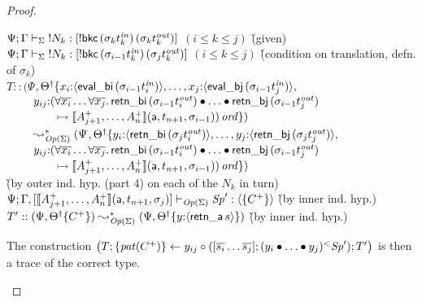 \begin{proof}
\begin{itemize}
  \begin{tabbing}
  ${\Psi}; {\Gamma} \vdash_{\Sigma} {{!}{N_k}} : {[{!}{{\sf bkc}\,({\sigma_k}t_k^{\it in})\,({\sigma_k}t_k^{\it out})}]}$ \quad $(i \leq k \leq j)$
  \` (given) 
  \\
  ${\Psi}; {\Gamma} \vdash_{\Sigma} {{!}{N_k}} : {[{!}{{\sf bkc}\,({\sigma_{i-1}}t_k^{\it in})\,({\sigma_j}t_k^{\it out})}]}$ \quad $(i \leq k \leq j)$
  \` (condition on translation, defn. of $\sigma_k$)
  \\
  $T :: (\Psi$\=$, {{\Theta}^\dag} \{
        x_i{:}\langle {{\sf eval\_bi}\,({\sigma_{i-1}}t^{\it in}_i)} \rangle, \ldots,
    x_j{:}\langle {{\sf eval\_bj}\,({\sigma_{i-1}}t^{\it in}_j)} \rangle,$\\
  \>$~ \qquad y_{ij}{:}(\forall\overline{x_i}\ldots\forall\overline{x_j}.\, 
     {\sf retn\_bi}\,(\sigma_{i-1}{t^{\it out}_i})
     \mathbin{\bullet} \ldots \mathbin{\bullet} 
     {\sf retn\_bj}\,(\sigma_{i-1}{t^{\it out}_j})$\\
  \>$~ \qquad\qquad
      \rightarrowtail \llbracket {A^+_{j+1},\ldots,A^+_n} \rrbracket({\sf a},{t_{n+1}},{\sigma_{i-1}}))\,{\it ord}
       \})$\\
  $~ \qquad \leadsto^*_{{\it Op}({\Sigma})} 
        (\Psi$\=$, {{\Theta}^\dag} \{
        y_i{:}\langle {{\sf retn\_bi}\,({\sigma_{j}}t^{\it out}_i)} \rangle, \ldots,
    y_j{:}\langle {{\sf retn\_bj}\,({\sigma_{j}}t^{\it out}_j)} \rangle,$\\
  \>$~ \qquad y_{ij}{:}(\forall\overline{x_i}\ldots\forall\overline{x_j}.\, 
     {\sf retn\_bi}\,(\sigma_{i-1}{t^{\it out}_i})
     \mathbin{\bullet} \ldots \mathbin{\bullet} 
     {\sf retn\_bj}\,(\sigma_{i-1}{t^{\it out}_j})$\\
  \>$~ \qquad\qquad
      \rightarrowtail \llbracket {A^+_{j+1},\ldots,A^+_n} \rrbracket({\sf a},{t_{n+1}},{\sigma_{i-1}}))\,{\it ord}
       \})$\\
  \` (by outer ind. hyp. (part 4) on each of the $N_k$ in turn)
  \\
  ${\Psi}; {\Gamma,[\llbracket {A^+_{j+1},\ldots,A^+_n} \rrbracket({\sf a},{t_{n+1}},{\sigma_{j}})]} \vdash_{{\it Op}({\Sigma})} {{\it Sp}'} : {\langle {\{ C^+ \}} \rangle}$  \` (by inner ind. hyp.)
  \\
  $T' :: (\Psi, {{{\Theta}^\dag}}\{{C^+}\}) \leadsto^*_{{\it Op}({\Sigma})}
        (\Psi, {{{\Theta}^\dag}}\{{y{:}\langle {{\sf retn\_a}\,s} \rangle}\})$ 
   \` (by inner ind. hyp.)
  \end{tabbing}

  The construction 
  $\left(T; \{{{\it pat}({C^+})}\} \leftarrow {y_{ij}} \circ {([{\overline{s_i}\ldots\overline{s_j}}]; {{({y_i} \mathbin{\bullet}{{\ldots} \mathbin{\bullet}{y_j}})}{^{<}}{{\it Sp}'}})}; T'\right) $
  is then a trace of the correct type.
  \bigskip


\end{itemize}
\end{proof}

